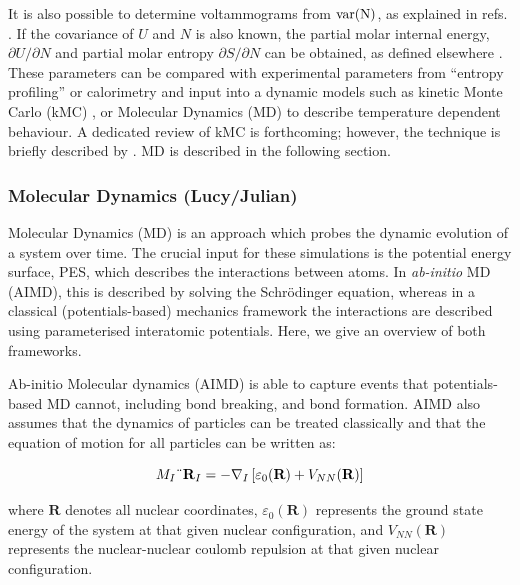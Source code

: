 \documentclass[../main.tex]{subfiles}
\begin{document}
It is also possible to determine voltammograms from $\rm{var}(N)$, as explained in refs. \cite{mercer_influence_2017,darling1999}. If the covariance of $U$ and $N$ is also known, the partial molar internal energy, $\partial{U}/\partial{N}$ and partial molar entropy $\partial{S}/\partial{N}$ can be obtained, as defined elsewhere \cite{mercer_influence_2017,Kim2001h}. These parameters can be compared with experimental parameters from ``entropy profiling'' or calorimetry \cite{mercer_influence_2017,schlueter_quantifying_2018, Mercer2019,THOMAS2003844,zhang2017} and input into a dynamic models such as kinetic Monte Carlo (kMC) \cite{gavilan-arriazu_kinetic_2020,darling1999,gavilan-arriazu_effect_2020,persson2010}, or Molecular Dynamics (MD) to describe temperature dependent behaviour. A dedicated review of kMC is forthcoming; however, the technique is briefly described by \citeauthor{VanderVen2020}. \cite{VanderVen2020} MD is described in the following section.

\subsubsection{Molecular Dynamics (Lucy/Julian)}
\label{sec:molecular_dynamics}
Molecular Dynamics (MD) is an approach which probes the dynamic evolution of a system over time. The crucial input for these simulations is the potential energy surface, PES, which describes the interactions between atoms. In \textit{ab-initio} MD (AIMD), this is described by solving the Schr\"{o}dinger equation, whereas in a classical (potentials-based) mechanics framework the interactions are described using parameterised interatomic potentials. Here, we give an overview of both frameworks.

Ab-initio Molecular dynamics (AIMD) is able to capture events that potentials-based MD cannot, including bond breaking, and bond formation. AIMD also assumes that the dynamics of particles can be treated classically and that the equation of motion for all particles can be written as:

\begin{equation}
    \label{eq:eom}
    M_I \textrm{\"{\textbf{R}}} _I=-\nabla_I\left[ \varepsilon_0(\textbf{R})+V_{NN}(\mathbf{R})\right]
\end{equation}

where $\textbf{R}$ denotes all nuclear coordinates, $\varepsilon_0(\textbf{R})$ represents the ground state energy of the system at that given nuclear configuration, and $V_{NN}(\textbf{R})$ represents the nuclear-nuclear coulomb repulsion at that given nuclear configuration. 
\end{document}
